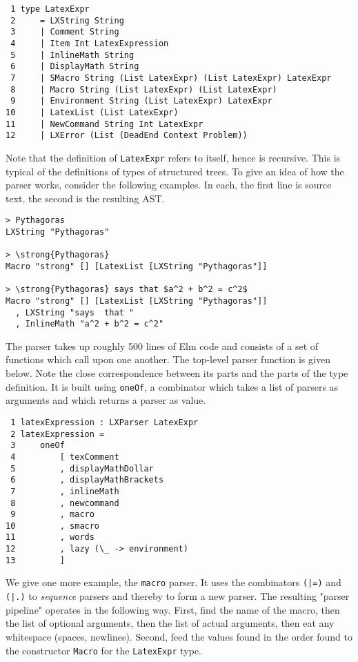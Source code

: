 \documentclass[11pt, oneside]{article}
\newcommand{\code}[1]{{\tt #1}}
\newcommand{\italic}[1]{{\sl #1}}
\newcommand{\strong}[1]{{\bf #1}}
\begin{document}
\begin{verbatim}
 1 type LatexExpr
 2     = LXString String
 3     | Comment String
 4     | Item Int LatexExpression
 5     | InlineMath String
 6     | DisplayMath String
 7     | SMacro String (List LatexExpr) (List LatexExpr) LatexExpr
 8     | Macro String (List LatexExpr) (List LatexExpr)
 9     | Environment String (List LatexExpr) LatexExpr
10     | LatexList (List LatexExpr)
11     | NewCommand String Int LatexExpr
12     | LXError (List (DeadEnd Context Problem))
\end{verbatim}
Note  that  the  definition  of   \code{LatexExpr} refers  to  itself,  hence  is  recursive.   This  is  typical  of  the  definitions  of  types  of  structured  trees.
 To  give  an  idea  of  how  the  parser  works,  consider  the  following   examples.  In each, the first
 line is source text, the second is the resulting AST.


\begin{verbatim}
> Pythagoras
LXString "Pythagoras"

> \strong{Pythagoras}
Macro "strong" [] [LatexList [LXString "Pythagoras"]]

> \strong{Pythagoras} says that $a^2 + b^2 = c^2$
Macro "strong" [] [LatexList [LXString "Pythagoras"]]
  , LXString "says  that "
  , InlineMath "a^2 + b^2 = c^2"
\end{verbatim}

The  parser  takes  up  roughly  500  lines  of  Elm  code  and  consists  of  a  set  of  functions  which  call  upon  one  another.   The  top-level  parser  function  is  given  below.   Note  the  close  correspondence  between  its  parts  and  the  parts  of  the  type  definition.   It  is  built  using     \code{oneOf},  a  combinator  which  takes  a  list  of  parsers  as  arguments  and  which  returns  a  parser  as  value.



\begin{verbatim}
 1 latexExpression : LXParser LatexExpr
 2 latexExpression =
 3     oneOf
 4         [ texComment
 5         , displayMathDollar
 6         , displayMathBrackets
 7         , inlineMath
 8         , newcommand
 9         , macro
10         , smacro
11         , words
12         , lazy (\_ -> environment)
13         ]
\end{verbatim}
We  give  one  more  example,  the   \code{macro} parser.   It  uses  the  combinators   \code{(|=)} and   \code{(|.)} to   \italic{sequence} parsers  and  thereby  to  form  a  new  parser.   The  resulting  "parser  pipeline"  operates   in  the  following  way.    First,  find  the  name  of  the  macro,  then  the  list  of  optional  arguments,  then  the  list  of   actual  arguments,  then  eat  any  whitespace  (spaces,  newlines).   Second,  feed  the  values  found  in  the  order  found  to  the  constructor   \code{Macro} for  the   \code{LatexExpr} type.
\end{document}
